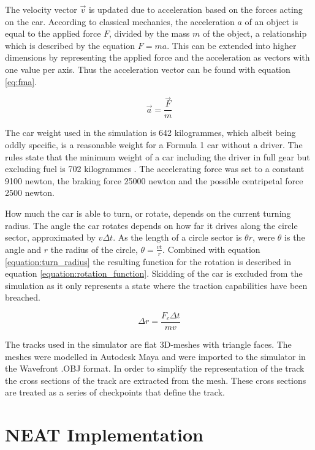 The velocity vector $\vec{v}$ is updated due to acceleration based on the forces acting on the car. According to classical mechanics, the acceleration $a$ of an object is equal to the applied force $F$, divided by the mass $m$ of the object, a relationship which is described by the equation $F = ma$. This can be extended into higher dimensions by representing the applied force and the acceleration as vectors with one value per axis. Thus the acceleration vector can be found with equation \ref{eq:fma}.

\begin{equation}
    \label{eq:fma}
    \vec{a} = \frac{\vec{F}}{m}  
\end{equation}

\noindent
The car weight used in the simulation is 642 kilogrammes, which albeit being oddly specific, is a reasonable weight for a Formula 1 car without a driver. The rules state that the minimum weight of a car including the driver in full gear but excluding fuel is 702 kilogrammes \cite{f1_weight}. The accelerating force was set to a constant 9100 newton, the braking force 25000 newton and the possible centripetal force 2500 newton.

How much the car is able to turn, or rotate, depends on the current turning radius. The angle the car rotates depends on how far it drives along the circle sector, approximated by $v\Delta t$. As the length of a circle sector is $\theta r$, were $\theta$ is the angle and $r$ the radius of the circle, \(\theta = \frac{vt}{r}\). Combined with equation \ref{equation:turn_radius} the resulting function for the rotation is described in equation \ref{equation:rotation_function}. Skidding of the car is excluded from the simulation as it only represents a state where the traction capabilities have been breached.

\begin{equation}
\label{equation:rotation_function}
    \Delta r = \frac{F_c \Delta t}{mv}
\end{equation}

\noindent
The tracks used in the simulator are flat 3D-meshes with triangle faces. The meshes were modelled in Autodesk Maya and were imported to the simulator in the Wavefront .OBJ format. In order to simplify the representation of the track the cross sections of the track are extracted from the mesh. These cross sections are treated as a series of checkpoints that define the track.  


\section{NEAT Implementation}

